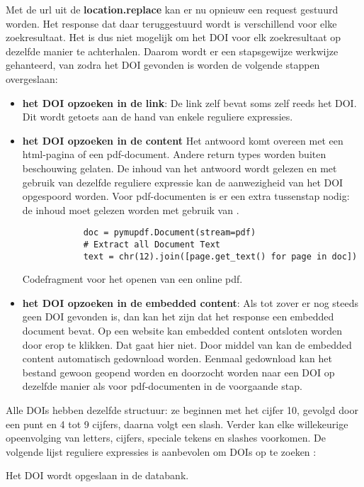 Met de url uit de \textbf{location.replace} kan er nu opnieuw een request gestuurd worden.
Het response dat daar teruggestuurd wordt is verschillend voor elke zoekresultaat. Het is dus niet mogelijk om het DOI voor elk zoekresultaat op dezelfde manier te achterhalen. Daarom wordt er een stapsgewijze werkwijze gehanteerd, van zodra het DOI gevonden is worden de volgende stappen overgeslaan:
\begin{itemize}
    \item \textbf{het DOI opzoeken in de link}: De link zelf bevat soms zelf reeds het DOI. Dit wordt getoets aan de hand van enkele reguliere expressies.
    \item \textbf{het DOI opzoeken in de content} Het antwoord komt overeen met een html-pagina of een pdf-document. Andere return types worden buiten beschouwing gelaten. De inhoud van het antwoord wordt gelezen en met gebruik van dezelfde reguliere expressie kan de aanwezigheid van het DOI opgespoord worden. Voor pdf-documenten is er een extra tussenstap nodig: de inhoud moet gelezen worden met gebruik van \autocite{Pymupdf2025}.
    \begin{listing}
        \begin{verbatim}
            doc = pymupdf.Document(stream=pdf)
            # Extract all Document Text
            text = chr(12).join([page.get_text() for page in doc])
        \end{verbatim}
    \caption[Pymupdf codefragment]{Codefragment voor het openen van een online pdf.}
\end{listing}
    \item \textbf{het DOI opzoeken in de embedded content}: Als tot zover er nog steeds geen DOI gevonden is, dan kan het zijn dat het response een embedded document bevat. Op een website kan embedded content ontsloten worden door erop te klikken. Dat gaat hier niet.  Door middel van \autocite{Selenium2025} kan de embedded content automatisch gedownload worden. Eenmaal gedownload kan het bestand gewoon geopend worden en doorzocht worden naar een DOI op dezelfde manier als voor pdf-documenten in de voorgaande stap.    
\end{itemize}
Alle DOIs hebben dezelfde structuur: ze beginnen met het cijfer 10, gevolgd door een punt en 4 tot 9 cijfers, daarna volgt een slash. Verder kan elke willekeurige opeenvolging van letters, cijfers, speciale tekens en slashes voorkomen.
De volgende lijst reguliere expressies is aanbevolen om DOIs op te zoeken \textcite{CrossrefRegex2025}:
Het DOI wordt opgeslaan in de databank.
